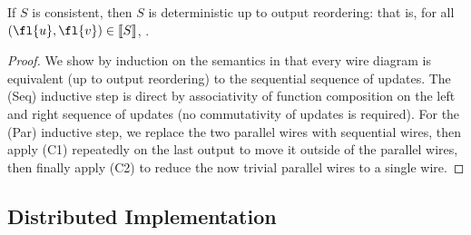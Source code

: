 
\begin{theorem}
\label{thm:consistency-implies-determinism}
If $S$ is consistent, then $S$ is deterministic up to output reordering:
that is,
for all $(\fl{u}, \fl{v}) \in \sem{S}$,
.
\end{theorem}
\begin{proof}
We show by induction on the semantics in 
that every wire diagram is equivalent (up to output reordering) to the sequential sequence
of updates.
The (Seq) inductive step is direct by associativity of function composition
on the left and right sequence of updates (no commutativity of updates is required).
For the (Par) inductive step, we replace the two parallel wires with sequential wires,
then apply (C1) repeatedly on the last output to move it outside of the parallel wires,
then finally apply (C2) to reduce the now trivial parallel wires to a single wire.
\end{proof}

\subsection{Distributed Implementation}
\label{sec:dist-impl}

